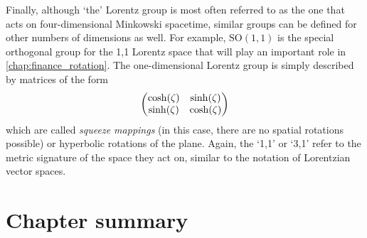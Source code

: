 Finally, although `the' Lorentz group is most often referred to as the one that acts on four-dimensional Minkowski spacetime, similar groups can be defined for other numbers of dimensions as well. For example, $\text{SO}(1, 1)$ is the special orthogonal group for the 1,1 Lorentz space that will play an important role in \cref{chap:finance_rotation}. The one-dimensional Lorentz group is simply described by matrices of the form
$$ \mqty(\cosh(\zeta) & \sinh(\zeta)\\\sinh(\zeta)&\cosh(\zeta)) $$
which are called \emph{squeeze mappings} (in this case, there are no spatial rotations possible) or hyperbolic rotations of the plane. Again, the `1,1' or `3,1' refer to the metric signature of the space they act on, similar to the notation of Lorentzian vector spaces.

\section*{Chapter summary}